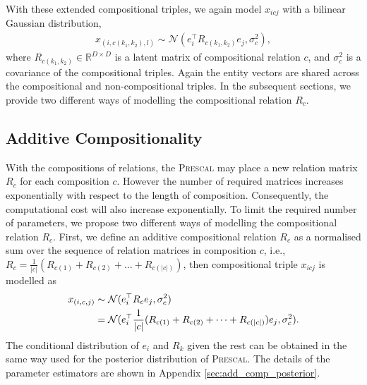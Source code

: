With these extended compositional triples, we again model $x_{icj}$ with a bilinear Gaussian distribution,
\begin{align}
x_{(i, {{c}(k_1, k_2)}, l)} \sim \mathcal{N}(e_i^\top R_{{c}(k_1,k_2)} e_j, \sigma_{c}^2),
\end{align}
where $R_{{c}(k_1,k_2)} \in \mathbb{R}^{D\times D}$ is a latent matrix of compositional relation $c$, and $
\sigma_{c}^2$ is a covariance of the compositional triples. Again the entity vectors are shared across the compositional and non-compositional triples.
In the subsequent sections, we provide two different ways of modelling the compositional relation $R_c$.

\subsection{Additive Compositionality}
With the compositions of relations, the \textsc{Prescal} may place a new relation matrix $R_c$ for each composition $c$. However the number of required matrices increases exponentially with respect to the length of composition. Consequently, the computational cost will also increase exponentially.
To limit the required number of parameters, we propose two different ways of modelling the compositional relation $R_c$.
First, we define an additive compositional relation $R_c$ as a normalised sum over
the sequence of relation matrices in composition $c$, i.e.,
$R_{{c}} = \frac{1}{|c|}(R_{c(1)} + R_{c(2)} + \dots + R_{c(|c|)})$, then compositional triple $x_{icj}$
is modelled as
\begin{align}
x_{(i, c, j)} &\sim \mathcal{N}(e_i^\top R_c e_j, \sigma_{c}^2) \\
&= \mathcal{N}(e_i^\top \frac{1}{|c|}(R_{c(1)} + R_{c(2)} + \dots + R_{c(|c|)}) e_j, \sigma_{c}^2). \notag
\end{align}
The conditional distribution of $e_i$ and $R_k$ given the rest can be obtained in the same way used for the posterior distribution of \textsc{Prescal}. The details of the parameter estimators are shown in Appendix \ref{sec:add_comp_posterior}.

